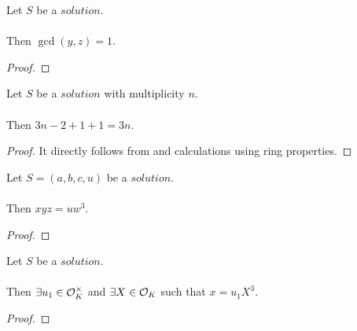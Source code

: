\begin{lemma}
    \label{lmm:coprime_y_z}
    \leanok
    Let $S$ be a $solution$.\\\\
    Then $\gcd(y, z) = 1$.
\end{lemma}
\begin{proof}
    \leanok
\end{proof}

\begin{lemma}
    \label{lmm:mult_minus_two_plus_one_plus_one}
    \leanok
    Let $S$ be a $solution$ with multiplicity $n$.\\\\
    Then $3n - 2 + 1 + 1 = 3n$.
\end{lemma}
\begin{proof}
    \leanok
    It directly follows from 
    and calculations using ring properties.
\end{proof}

\begin{lemma}
    \label{lmm:x_mul_y_mul_z_eq_u_w_pow_three}
    \leanok
    Let $S=(a,b,c,u)$ be a $solution$.\\\\
    Then $x y z = u w^3$.
\end{lemma}
\begin{proof}
    \leanok
\end{proof}

\begin{lemma}
    \label{lmm:x_eq_unit_mul_cube}
    \leanok
    Let $S$ be a $solution$.\\\\
    Then $\exists u_1 \in \mathcal{O}^\times_K$ and $\exists X \in \mathcal{O}_K$
    such that $x = u_1 X^3$.
\end{lemma}
\begin{proof}
    \leanok
\end{proof}

